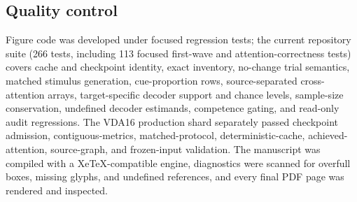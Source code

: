 \documentclass[11pt,a4paper]{article}
\begin{document}
\subsection{Quality control}
Figure code was developed under focused regression tests; the current repository suite (266 tests, including 113 focused first-wave and attention-correctness tests) covers cache and checkpoint identity, exact inventory, no-change trial semantics, matched stimulus generation, cue-proportion rows, source-separated cross-attention arrays, target-specific decoder support and chance levels, sample-size conservation, undefined decoder estimands, competence gating, and read-only audit regressions. The VDA16 production shard separately passed checkpoint admission, contiguous-metrics, matched-protocol, deterministic-cache, achieved-attention, source-graph, and frozen-input validation. The manuscript was compiled with a XeTeX-compatible engine, diagnostics were scanned for overfull boxes, missing glyphs, and undefined references, and every final PDF page was rendered and inspected.
\end{document}

